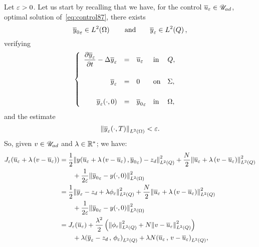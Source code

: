 Let $\varepsilon > 0$. Let us start by recalling that we have, for the control
${\overline{u}}_{\varepsilon}\in{\mathscr{U}}_{ad}$, optimal solution of~\eqref{eq:control87}, there exists
\begin{equation*}
    {\overline{y}_{0}}_{\varepsilon}\in L^{2}\!\left({\Omega}\right)\qquad\text{and}\qquad
    {\overline{y}}_{\varepsilon}\in L^{2}\!\left({Q}\right),
\end{equation*}
verifying
\begin{equation*}
    \begin{cases}\displaystyle
        \begin{array}{rclll}
            \dfrac{\partial{}{\overline{y}}_{\varepsilon}}{\partial{}t} - \Delta{\overline{y}}_{\varepsilon} & = & {\overline{u}}_{\varepsilon} &
            \text{in} & Q,\\
            \\
            {\overline{y}}_{\varepsilon} & = & 0 & \text{on} & \Sigma,\\
            \\
            {{\overline{y}}_{\varepsilon}}\!\left({\cdot, 0}\right) & = & {\overline{y}_{0}}_{\varepsilon} &
            \text{in} & \Omega,
        \end{array}
    \end{cases}
\end{equation*}
and the estimate
\begin{equation*}
    {\left\|{ { {\overline{y}}_{\varepsilon} }\!\left({\cdot,T}\right)  }\right\|}_{L^{2}\left({\Omega}\right)} < \varepsilon.
\end{equation*}
So, given $v\in{\mathscr{U}}_{ad}$ and $\lambda\in{\mathbb{R}}^{*}$; we have:
\begin{equation*}
    \begin{split}
        J_{\veps}\!\left({%
            \bareps{u} + \lambda\left({v - \bareps{u}}\right)
        }\right) &= \dfrac{1}{2}\normecq{%
            y\!\left({%
                \bareps{u} + \lambda\left({v - \bareps{u}}\right),
                {\bar{y}_{0}}_{\veps}
            }\right) - z_{d}
        } + \dfrac{N}{2}\normecq{%
            \bareps{u} + \lambda\left({v - \bareps{u}}\right)
        }\\
        &\qquad + \dfrac{1}{2\veps}\normecohm{%
            {\bar{y}_{0}}_{\veps} - \condinitiale{y}
        }\\
        & = \dfrac{1}{2}\normecq{%
            \bareps{y} - z_{d} + \lambda{\fieps}
        } + \dfrac{N}{2}\normecq{%
            \bareps{u} + \lambda\left({v - \bareps{u}}\right)
        }\\
        &\qquad + \dfrac{1}{2\veps}\normecohm{%
            {\bar{y}_{0}}_{\veps} - \condinitiale{y}
        }\\
        & = J_{\veps}\!\left({\bareps{u}}\right) +
        \dfrac{{\lambda}^{2}}{2}\left({%
            \normecq{\fieps} + N\normecq{v - \bareps{u}}
        }\right)\\
        &\qquad + \lambda\scalaireq{%
            \bareps{y} - z_{d}
        }{%
            \fieps{}
        } + \lambda N\scalaireq{%
            \bareps{u}
        }{%
            v - \bareps{u}
        },
    \end{split}
\end{equation*}

